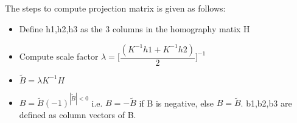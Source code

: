 \documentclass[a4paper, 10pt]{article}
\begin{document}
\begin{multicols}{2}
		
		\subsection{}		
		
		The steps to compute projection matrix is given as follows:
		\begin{itemize}
			\item Define h1,h2,h3 as the 3 columns in the homography
			matix H
			\item Compute scale factor $\lambda = \Big[ \dfrac{(K^{-1}h1 + K^{-1}h2)}{2}\Big]^{-1}$
			\item $\tilde{B} = \lambda K^{-1}H$ 
			\item $B = \tilde{B}(-1)^{|\tilde{B}|<0}$ i.e. $B = -\tilde{B}$ if B is negative, else $B = \tilde{B}$. b1,b2,b3 are defined as column vectors of B.
		\end{itemize}
		

		
	\end{multicols}
	
\end{document}
